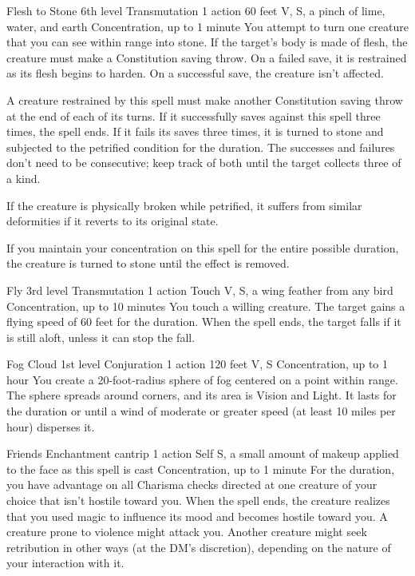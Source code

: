 \documentclass[10pt,a4paper,twoside,bg=print,twocolumn,openany,nodeprecatedcode]{dndbook}
\begin{document}
\DndSpellHeader%
{Flesh to Stone}
{6th level Transmutation}
{1 action}
{60 feet}
{V, S, a pinch of lime, water, and earth}
{Concentration, up to 1 minute}
You attempt to turn one creature that you can see within range into stone. If the target's body is made of flesh, the creature must make a Constitution saving throw. On a failed save, it is restrained as its flesh begins to harden. On a successful save, the creature isn't affected.

A creature restrained by this spell must make another Constitution saving throw at the end of each of its turns. If it successfully saves against this spell three times, the spell ends. If it fails its saves three times, it is turned to stone and subjected to the petrified condition for the duration. The successes and failures don't need to be consecutive; keep track of both until the target collects three of a kind.

If the creature is physically broken while petrified, it suffers from similar deformities if it reverts to its original state.

If you maintain your concentration on this spell for the entire possible duration, the creature is turned to stone until the effect is removed.



\DndSpellHeader%
{Fly}
{3rd level Transmutation}
{1 action}
{Touch}
{V, S, a wing feather from any bird}
{Concentration, up to 10 minutes}
You touch a willing creature. The target gains a flying speed of 60 feet for the duration. When the spell ends, the target falls if it is still aloft, unless it can stop the fall.



\DndSpellHeader%
{Fog Cloud}
{1st level Conjuration}
{1 action}
{120 feet}
{V, S}
{Concentration, up to 1 hour}
You create a 20-foot-radius sphere of fog centered on a point within range. The sphere spreads around corners, and its area is Vision and Light. It lasts for the duration or until a wind of moderate or greater speed (at least 10 miles per hour) disperses it.



\DndSpellHeader%
{Friends}
{Enchantment cantrip}
{1 action}
{Self}
{S, a small amount of makeup applied to the face as this spell is cast}
{Concentration, up to 1 minute}
For the duration, you have advantage on all Charisma checks directed at one creature of your choice that isn't hostile toward you. When the spell ends, the creature realizes that you used magic to influence its mood and becomes hostile toward you. A creature prone to violence might attack you. Another creature might seek retribution in other ways (at the DM's discretion), depending on the nature of your interaction with it.
\end{document}

